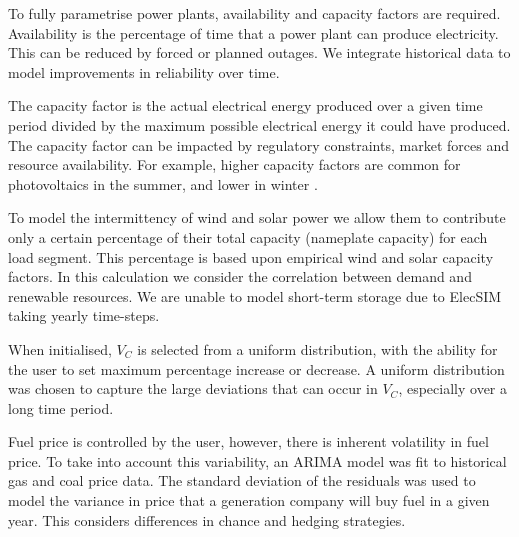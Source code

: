 To fully parametrise power plants, availability and capacity factors are required. Availability is the percentage of time that a power plant can produce electricity. This can be reduced by forced or planned outages. We integrate historical data to model improvements in reliability over time.

The capacity factor is the actual electrical energy produced over a given time period divided by the maximum possible electrical energy it could have produced. The capacity factor can be impacted by regulatory constraints, market forces and resource availability. For example, higher capacity factors are common for photovoltaics in the summer, and lower in winter \cite{Stoft2002}. 

To model the intermittency of wind and solar power we allow them to contribute only a certain percentage of their total capacity (nameplate capacity) for each load segment. This percentage is based upon empirical wind and solar capacity factors. In this calculation we consider the correlation between demand and renewable resources. We are unable to model short-term storage due to ElecSIM taking yearly time-steps.

When initialised, $V_C$ is selected from a uniform distribution, with the ability for the user to set maximum percentage increase or decrease. A uniform distribution was chosen to capture the large deviations that can occur in $V_C$, especially over a long time period. \vphantom{By doing this, the variance in costs between individual power plants for processes such as preventative and corrective maintenance, labour costs and skill, health and safety and chance are different per plant instant.}

Fuel price is controlled by the user, however, there is inherent volatility in fuel price. To take into account this variability, an ARIMA model was fit to historical gas and coal price data. The standard deviation of the residuals was used to model the variance in price that a generation company will buy fuel in a given year. This considers differences in chance and hedging strategies.



